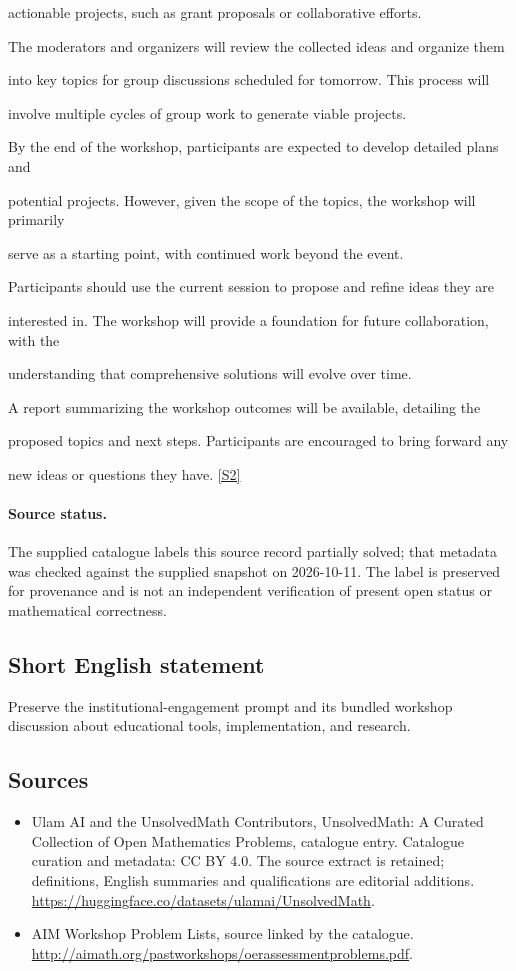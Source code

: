 \documentclass[11pt]{article}
\begin{document}
actionable projects, such as grant proposals or collaborative efforts.

The moderators and organizers will review the collected ideas and organize them

into key topics for group discussions scheduled for tomorrow. This process will

involve multiple cycles of group work to generate viable projects.

By the end of the workshop, participants are expected to develop detailed plans and

potential projects. However, given the scope of the topics, the workshop will primarily

serve as a starting point, with continued work beyond the event.

Participants should use the current session to propose and refine ideas they are

interested in. The workshop will provide a foundation for future collaboration, with the

understanding that comprehensive solutions will evolve over time.

A report summarizing the workshop outcomes will be available, detailing the

proposed topics and next steps. Participants are encouraged to bring forward any

new ideas or questions they have. \href{http://aimath.org/pastworkshops/oerassessmentproblems.pdf}{[S2]}
\paragraph{Source status.}
The supplied catalogue labels this source record partially solved; that metadata was checked against the supplied snapshot on 2026-10-11. The label is preserved for provenance and is not an independent verification of present open status or mathematical correctness.
\subsection{Short English statement}
Preserve the institutional-engagement prompt and its bundled workshop discussion about educational tools, implementation, and research.
\subsection{Sources}
\begin{itemize}
\item[S1] Ulam AI and the UnsolvedMath Contributors, UnsolvedMath: A Curated Collection of Open Mathematics Problems, catalogue entry. Catalogue curation and metadata: CC BY 4.0. The source extract is retained; definitions, English summaries and qualifications are editorial additions.
\url{https://huggingface.co/datasets/ulamai/UnsolvedMath}.
\item[S2] AIM Workshop Problem Lists, source linked by the catalogue.
\url{http://aimath.org/pastworkshops/oerassessmentproblems.pdf}.
\end{itemize}
\end{document}
